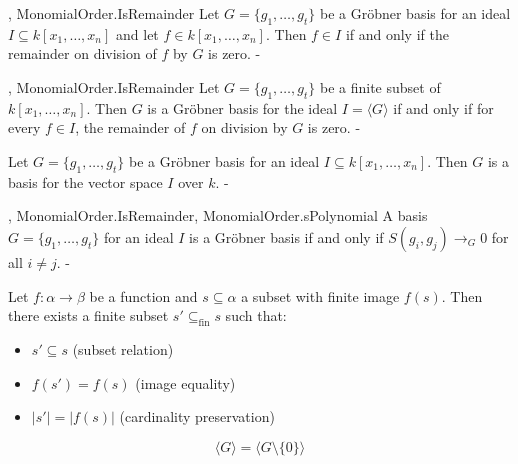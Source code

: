 \begin{lemma}\label{MonomialOrder.groebner_basis_isRemainder_zero_iff_mem_span}

  ,
{MonomialOrder.IsRemainder}
  Let \( G = \{g_1, \dots, g_t\} \) be a Gröbner basis for an ideal \( I \subseteq k[x_1, \dots, x_n] \) and let \( f \in k[x_1, \dots, x_n] \). Then \( f \in I \) if and only if the remainder on division of \( f \) by \( G \) is zero.
-
\end{lemma}

\begin{lemma}\label{MonomialOrder.is_groebner_basis_iff}

  ,
{MonomialOrder.IsRemainder}
  Let \( G = \{g_1, \ldots, g_t\} \) be a finite subset of \( k[x_1, \ldots, x_n] \). Then \( G \) is a Gröbner basis for the ideal \( I = \langle G \rangle \) if and only if  for every \( f \in I \), the remainder of \( f \) on division by \( G \) is zero.
-
\end{lemma}

\begin{lemma}\label{MonomialOrder.groebner_basis_is_basis}

  Let \( G = \{g_1, \ldots, g_t\} \) be a Gröbner basis for an ideal \( I \subseteq k[x_1, \ldots, x_n] \). Then \( G \) is a basis for the vector space \( I \) over \( k \).
-
\end{lemma}

\begin{lemma}\label{MonomialOrder.buchberger_criterion}

  ,
{MonomialOrder.IsRemainder},
{MonomialOrder.sPolynomial}
  A basis \( G = \{ g_1, \ldots, g_t \} \) for an ideal \( I \) is a Gröbner basis if and only if \( S(g_i, g_j) \to_G 0 \) for all \( i \neq j \).
-
\end{lemma}

\begin{lemma}\label{Set.finset_subset_preimage_of_finite_image}
  \leanok

  Let $f: \alpha \to \beta$ be a function and $s \subseteq \alpha$ a subset with finite image $f(s)$. Then there exists a finite subset $s' \subseteq_{\text{fin}} s$ such that:
\begin{itemize}
\item $s' \subseteq s$ (subset relation)
\item $f(s') = f(s)$ (image equality)
\item $|s'| = |f(s)|$ (cardinality preservation)
\end{itemize}

\end{lemma}

\begin{lemma}\label{Submodule.span_sdiff_singleton_zero}
  \leanok

  \[
\langle G \rangle = \langle G \setminus \{0\} \rangle
\]

\end{lemma}